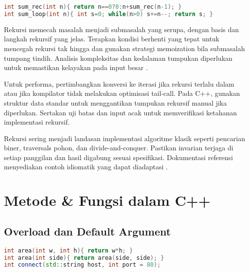 \documentclass[../main.tex]{subfiles}
\begin{document}
\begin{lstlisting}[language=C++, caption={Tail-recursion vs loop (C++)}]
int sum_rec(int n){ return n==0?0:n+sum_rec(n-1); }
int sum_loop(int n){ int s=0; while(n>0) s+=n--; return s; }
\end{lstlisting}
Rekursi memecah masalah menjadi submasalah yang serupa, dengan basis dan langkah rekursif yang jelas. Terapkan kondisi berhenti yang tepat untuk mencegah rekursi tak hingga dan gunakan strategi memoization bila submasalah tumpang tindih. Analisis kompleksitas dan kedalaman tumpukan diperlukan untuk memastikan kelayakan pada input besar \parencite{cpp-reference,gnu-c-manual}.

Untuk performa, pertimbangkan konversi ke iterasi jika rekursi terlalu dalam atau jika kompilator tidak melakukan optimisasi tail-call. Pada C++, gunakan struktur data standar untuk menggantikan tumpukan rekursif manual jika diperlukan. Sertakan uji batas dan input acak untuk memverifikasi ketahanan implementasi rekursif.

Rekursi sering menjadi landasan implementasi algoritme klasik seperti pencarian biner, traversals pohon, dan divide-and-conquer. Pastikan invarian terjaga di setiap panggilan dan hasil digabung sesuai spesifikasi. Dokumentasi referensi menyediakan contoh idiomatik yang dapat diadaptasi \parencite{cpp-reference,gnu-c-manual}.

\section{Metode \& Fungsi dalam C++}
\subsection{Overload dan Default Argument}
\begin{lstlisting}[language=C++, caption={Overload dan default argument}]
int area(int w, int h){ return w*h; }
int area(int side){ return area(side, side); }
int connect(std::string host, int port = 80);
\end{lstlisting}
\end{document}
